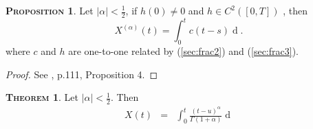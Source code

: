 \documentclass[a4paper, twoside, 11pt]{article}
\theoremstyle{definition}
\newtheorem{theorem}[definition]{\scshape Theorem}
\newtheorem{proposition}[definition]{\scshape Proposition}
\begin{document}
\begin{proposition}
  Let $|\alpha| < \frac{1}{2}$, if $h(0) \neq 0$ and $h \in C^2([0, T])$ , then 
  $$X^{(\alpha)}(t) = \int_0^t c(t-s) \mathop{dB_s}.$$
  where $c$ and $h$ are one-to-one related by (\ref{sec:frac2}) and (\ref{sec:frac3}).
\end{proposition}
\begin{proof}
  See  \cite{core}, p.111, Proposition 4.
  \end{proof}
  \begin{theorem}
	Let $|\alpha| < \frac{1}{2}$. Then
	\begin{eqnarray}
	X(t) &=& \int_0^t \frac{(t-u)^\alpha}{\Gamma(1+\alpha)}\mathop{dX^{(\alpha)}_u}
	\label{sec:imp}
  \end{eqnarray}
  \end{theorem}
\end{document}
